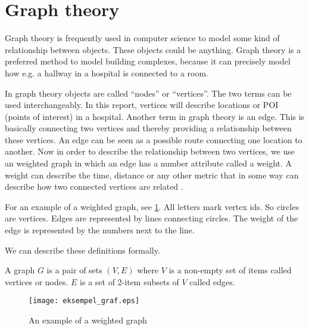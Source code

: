 \section{Graph theory}

Graph theory is frequently used in computer science to model some kind of relationship between objects. These objects could be anything. Graph theory is a preferred method to model building complexes, because it can precisely model how e.g. a hallway in a hospital is connected to a room.

In graph theory objects are called \enquote{nodes} or \enquote{vertices}. The two terms can be used interchangeably. In this report, vertices will describe locations or POI (points of interest) in a hospital. Another term in graph theory is an edge. This is basically connecting two vertices and thereby providing a relationship between these vertices. An edge can be seen as a possible route connecting one location to another. Now in order to describe the relationship between two vertices, we use an weighted graph in which an edge has a number attribute called a weight. A weight can describe the time, distance or any other metric that in some way can describe how two connected vertices are related \cite{wiki_graph_glos,MIT2012}. 

For an example of a weighted graph, see \cref{fig:graph}. All letters mark vertex ids. So circles are vertices. Edges are represented by lines connecting circles. The weight of the edge is represented by the numbers next to the line.

We can describe these definitions formally.\cite{MIT2012}
\begin{mydef}
	A graph $G$ is a pair of sets $(V,E)$ where $V$ is a non-empty set of items called vertices or nodes. $E$ is a set of 2-item subsets of $V$ called edges.
\end{mydef}

  \begin{figure}[ht!]
    \centering
    \texttt{[image: eksempel\_graf.eps]}
    \caption{An example of a weighted graph}
    \label{fig:graph}
  \end{figure}


